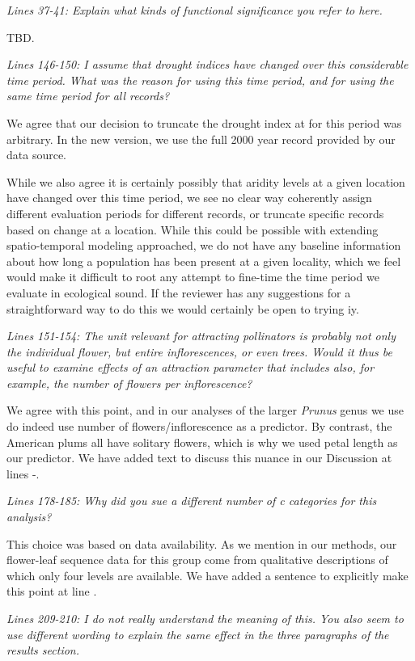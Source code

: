 \documentclass{article}[12pt]
\begin{document}
\emph{Lines 37-41: Explain what kinds of functional significance you refer to here.}

TBD.

\emph{Lines 146-150: I assume that drought indices have changed over this considerable time period. What was the reason for using this time period, and for using the same time period for all records?}

We agree that our decision to truncate the drought index at for this period was arbitrary. In the new version, we use the full 2000 year record provided by our data source.

While we also agree it is certainly possibly that aridity levels at a given location have changed over this time period, we see no clear way coherently assign different evaluation periods for different records, or truncate specific records based on change at a location. While this could be possible with extending spatio-temporal modeling approached, we do not have any baseline information about how long a population has been present at a given locality, which we feel would make it difficult to root any attempt to fine-time the time period we evaluate in ecological sound. If the reviewer has any suggestions for a straightforward way to do this we would certainly be open to trying iy.


\emph{Lines 151-154: The unit relevant for attracting pollinators is probably not only the individual flower, but entire inflorescences, or even trees. Would it thus be useful to examine effects of an attraction parameter that includes also, for example, the number of flowers per inflorescence?}

We agree with this point, and in our analyses of the larger \emph{Prunus} genus we use do indeed use number of flowers/inflorescence as a predictor. By contrast, the American plums all have solitary flowers, which is why we used petal length as our predictor. We have added text to discuss this nuance in our Discussion at lines -.

\emph{Lines 178-185: Why did you sue a different number of c categories for this analysis?}

This choice was based on data availability. As we mention in our methods, our flower-leaf sequence data for this group come from qualitative descriptions of which only four levels are available. We have added a sentence to explicitly make this point at line .

\emph{Lines 209-210: I do not really understand the meaning of this. You also seem to use different wording to explain the same effect in the three paragraphs of the results section.}
\end{document}
